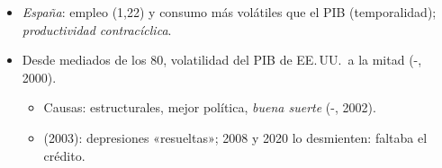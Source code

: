 \documentclass{article}
\begin{document}
\begin{columnas}
\begin{itemize}
  \begin{itemize}
  \item todo se mueve con el PIB; persistencia $\approx$0,9;
  \item \emph{inversión} 2,5-4,5 veces el PIB, \emph{consumo} menos; existencias muy volátiles;
  \item \emph{empleo} procíclico; paro contracíclico; \emph{salario real} débilmente procíclico;
  \item bolsa y pendiente de la curva, adelantadas.
  \end{itemize}
\item \emph{España}: empleo (1,22) y consumo más volátiles que el PIB (temporalidad); \emph{productividad contracíclica}.
\end{itemize}

\begin{itemize}
\item Desde mediados de los 80, volatilidad del PIB de EE.\,UU.\ a la mitad (-, 2000).
  \begin{itemize}
  \item Causas: estructurales, mejor política, \emph{buena suerte} (-, 2002).
  \item {} (2003): depresiones «resueltas»; 2008 y 2020 lo desmienten: faltaba el crédito.
  \end{itemize}
\end{itemize}


\end{columnas}
\end{document}
